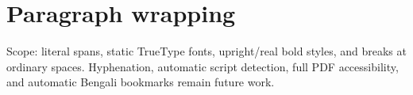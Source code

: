 \documentclass[12pt]{article}
\begin{document}
\section{Paragraph wrapping}
\begin{minipage}{0.62\linewidth}
\end{minipage}

\smallskip
\small Scope: literal \texttt{\string\bn} spans, static TrueType fonts, upright/real
bold styles, and breaks at ordinary spaces. Hyphenation, automatic script detection,
full PDF accessibility, and automatic Bengali bookmarks remain future work.
\end{document}
